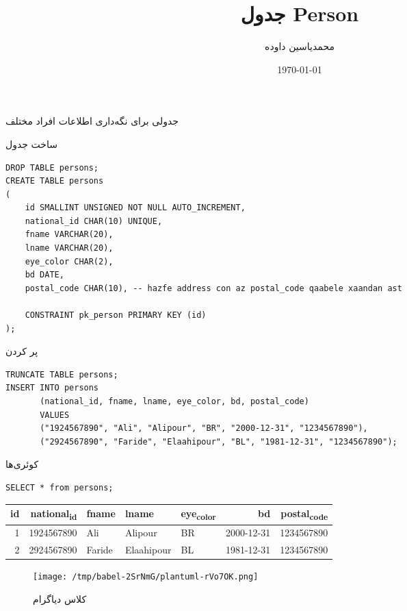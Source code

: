 \documentclass[a4paper]{article}
\author{محمدیاسین داوده}
\date{\today}
\title{جدول Person}
\begin{document}
\maketitle
جدولی برای نگه‌داری اطلاعات افراد مختلف

\begin{listing}[htbp]
\caption{ساخت جدول}
\begin{verbatim}
DROP TABLE persons;
CREATE TABLE persons
(
    id SMALLINT UNSIGNED NOT NULL AUTO_INCREMENT,
    national_id CHAR(10) UNIQUE,
    fname VARCHAR(20),
    lname VARCHAR(20),
    eye_color CHAR(2),
    bd DATE,
    postal_code CHAR(10), -- hazfe address con az postal_code qaabele xaandan ast

    CONSTRAINT pk_person PRIMARY KEY (id)
);
\end{verbatim}
\end{listing}

\begin{listing}[htbp]
\caption{پر کردن}
\begin{verbatim}
TRUNCATE TABLE persons;
INSERT INTO persons
       (national_id, fname, lname, eye_color, bd, postal_code)
       VALUES
       ("1924567890", "Ali", "Alipour", "BR", "2000-12-31", "1234567890"),
       ("2924567890", "Faride", "Elaahipour", "BL", "1981-12-31", "1234567890");
\end{verbatim}
\end{listing}

\begin{listing}[htbp]
\caption{کوئری‌ها}
\begin{verbatim}
SELECT * from persons;
\end{verbatim}
\end{listing}

\begin{center}
\begin{tabular}{rrlllrr}
id & national\textsubscript{id} & fname & lname & eye\textsubscript{color} & bd & postal\textsubscript{code}\\
\hline
1 & 1924567890 & Ali & Alipour & BR & 2000-12-31 & 1234567890\\
2 & 2924567890 & Faride & Elaahipour & BL & 1981-12-31 & 1234567890\\
\end{tabular}
\end{center}

\begin{figure}[htbp]
\centering
\texttt{[image: /tmp/babel-2SrNmG/plantuml-rVo7OK.png]}
\caption{کلاس دیاگرام}
\end{figure}
\end{document}
